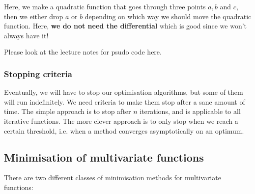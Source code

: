 Here, we make a quadratic function that goes through three points $a,
b$ and $c$, then we either drop $a$ or $b$ depending on which way we
should move the quadratic function. Here, \textbf{we do not need the
differential} which is good since we won't always have it!

Please look at the lecture notes for psudo code here.


\subsubsection{Stopping criteria}

Eventually, we will have to stop our optimisation algorithms, but some of them
will run indefinitely. We need criteria to make them stop after a sane amount of
time. The simple approach is to stop after $n$ iterations, and is applicable to
all iterative functions. The more clever approach is to only stop when we reach
a certain threshold, i.e. when a method converges asymptotically on an optimum.

\subsection{Minimisation of multivariate functions}

There are two different classes of minimisation methods for multivariate
functions:

